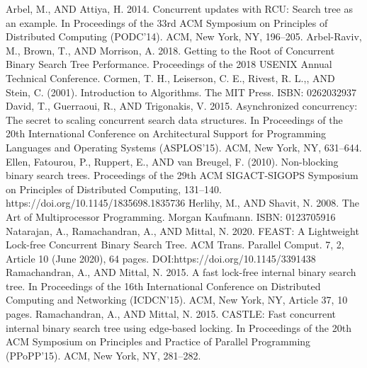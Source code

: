 \documentclass[conference]{IEEEtran}
\begin{document}
\begin{thebibliography}{00}
 Arbel, M., AND Attiya, H. 2014. Concurrent updates with RCU: Search tree as an example. In Proceedings of the 33rd ACM Symposium on Principles of Distributed Computing (PODC’14). ACM, New York, NY, 196–205.
 Arbel-Raviv, M., Brown, T., AND Morrison, A. 2018. Getting to the Root of Concurrent Binary Search Tree Performance. Proceedings of the 2018 USENIX Annual Technical Conference.
 Cormen, T. H., Leiserson, C. E., Rivest, R. L.,, AND Stein, C. (2001). Introduction to Algorithms. The MIT Press. ISBN: 0262032937 
 David, T., Guerraoui, R., AND Trigonakis, V. 2015. Asynchronized concurrency: The secret to scaling concurrent search data structures. In Proceedings of the 20th International Conference on Architectural Support for Programming Languages and
Operating Systems (ASPLOS’15). ACM, New York, NY, 631–644.
 Ellen, Fatourou, P., Ruppert, E., AND van Breugel, F. (2010). Non-blocking binary search trees. Proceedings of the 29th ACM SIGACT-SIGOPS Symposium on Principles of Distributed Computing, 131–140. https://doi.org/10.1145/1835698.1835736
 Herlihy, M., AND Shavit, N. 2008. The Art of Multiprocessor Programming. Morgan Kaufmann. ISBN: 0123705916 
 Natarajan, A., Ramachandran, A., AND Mittal, N. 2020. FEAST: A Lightweight Lock-free Concurrent Binary Search Tree. ACM Trans. Parallel Comput. 7, 2, Article 10 (June 2020), 64 pages. DOI:https://doi.org/10.1145/3391438
 Ramachandran, A., AND Mittal, N. 2015. A fast lock-free internal binary search tree. In Proceedings of the 16th International Conference on Distributed Computing and Networking (ICDCN’15). ACM, New York, NY, Article 37, 10 pages.
 Ramachandran, A., AND Mittal, N. 2015. CASTLE: Fast concurrent internal binary search tree using edge-based locking. In Proceedings of the 20th ACM Symposium on Principles and Practice of Parallel Programming (PPoPP’15). ACM, New York, NY, 281–282.
\end{thebibliography}
\end{document}
